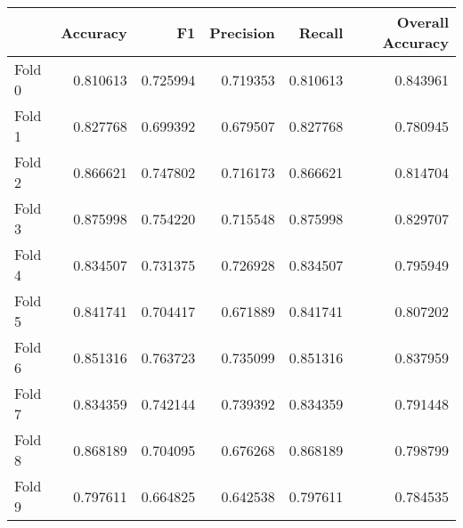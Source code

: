 \begin{tabular}{lrrrrr}
\toprule
{} &  Accuracy &        F1 &  Precision &    Recall &  Overall Accuracy \\
\midrule
Fold 0 &  0.810613 &  0.725994 &   0.719353 &  0.810613 &          0.843961 \\
Fold 1 &  0.827768 &  0.699392 &   0.679507 &  0.827768 &          0.780945 \\
Fold 2 &  0.866621 &  0.747802 &   0.716173 &  0.866621 &          0.814704 \\
Fold 3 &  0.875998 &  0.754220 &   0.715548 &  0.875998 &          0.829707 \\
Fold 4 &  0.834507 &  0.731375 &   0.726928 &  0.834507 &          0.795949 \\
Fold 5 &  0.841741 &  0.704417 &   0.671889 &  0.841741 &          0.807202 \\
Fold 6 &  0.851316 &  0.763723 &   0.735099 &  0.851316 &          0.837959 \\
Fold 7 &  0.834359 &  0.742144 &   0.739392 &  0.834359 &          0.791448 \\
Fold 8 &  0.868189 &  0.704095 &   0.676268 &  0.868189 &          0.798799 \\
Fold 9 &  0.797611 &  0.664825 &   0.642538 &  0.797611 &          0.784535 \\
\bottomrule
\end{tabular}
